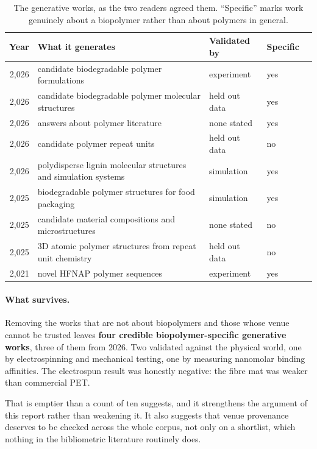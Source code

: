\documentclass[11pt,a4paper]{article}
\begin{document}
\begin{table}[htbp]
\centering
\caption{The generative works, as the two readers agreed them. ``Specific'' marks work
genuinely about a biopolymer rather than about polymers in general.}
\label{tab:generative}
\small
\begin{tabular}{rp{5.6cm}p{3.5cm}ll}
\toprule
Year & What it generates & Validated by & Specific \\
\midrule
2,026 & candidate biodegradable polymer formulations & experiment & yes \\
2,026 & candidate biodegradable polymer molecular structures & held out data & yes \\
2,026 & answers about polymer literature & none stated & yes \\
2,026 & candidate polymer repeat units & held out data & no \\
2,026 & polydisperse lignin molecular structures and simulation systems & simulation & yes \\
2,025 & biodegradable polymer structures for food packaging & simulation & yes \\
2,025 & candidate material compositions and microstructures & none stated & no \\
2,025 & 3D atomic polymer structures from repeat unit chemistry & held out data & no \\
2,021 & novel HFNAP polymer sequences & experiment & yes \\
\bottomrule
\end{tabular}
\end{table}


\paragraph{What survives.} Removing the works that are not about biopolymers and those
whose venue cannot be trusted leaves \textbf{four credible biopolymer-specific generative
works}, three of them from 2026. Two validated against the physical world, one by
electrospinning and mechanical testing, one by measuring nanomolar binding affinities. The
electrospun result was honestly negative: the fibre mat was weaker than commercial PET.

That is emptier than a count of ten suggests, and it strengthens the argument of this
report rather than weakening it. It also suggests that venue provenance deserves to be
checked across the whole corpus, not only on a shortlist, which nothing in the bibliometric
literature routinely does.
\end{document}
